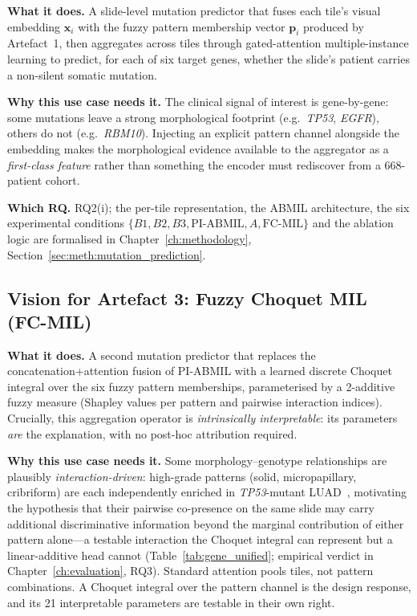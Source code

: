\textbf{What it does.}
A slide-level mutation predictor that fuses each tile's visual
embedding $\mathbf{x}_i$ with the fuzzy pattern membership vector
$\mathbf{p}_i$ produced by Artefact~1, then aggregates across tiles
through gated-attention multiple-instance learning to predict, for
each of six target genes, whether the slide's patient carries a
non-silent somatic mutation.

\textbf{Why this use case needs it.}
The clinical signal of interest is gene-by-gene: some mutations leave
a strong morphological footprint (e.g.~\textit{TP53}, \textit{EGFR}),
others do not (e.g.~\textit{RBM10}).
Injecting an explicit pattern channel alongside the embedding makes
the morphological evidence available to the aggregator as a
\emph{first-class feature} rather than something the encoder must
rediscover from a 668-patient cohort.

\textbf{Which RQ.}
RQ2(i); the per-tile representation, the ABMIL architecture, the
six experimental conditions $\{B1, B2, B3, \text{PI-ABMIL}, A,
\text{FC-MIL}\}$ and the ablation logic are formalised in
Chapter~\ref{ch:methodology},
Section~\ref{sec:meth:mutation_prediction}.


\subsection{Vision for Artefact 3: Fuzzy Choquet MIL (FC-MIL)}
\label{sec:uc:artifact3}

\textbf{What it does.}
A second mutation predictor that replaces the concatenation+attention
fusion of PI-ABMIL with a learned discrete Choquet integral over the
six fuzzy pattern memberships, parameterised by a 2-additive fuzzy
measure (Shapley values per pattern and pairwise interaction indices).
Crucially, this aggregation operator is \emph{intrinsically
interpretable}: its parameters \emph{are} the explanation, with no
post-hoc attribution required.

\textbf{Why this use case needs it.}
Some morphology--genotype relationships are plausibly
\emph{interaction-driven}: high-grade patterns
(solid, micropapillary, cribriform) are each independently enriched
in \textit{TP53}-mutant
LUAD~\cite{ahn2022tp53highgrade,zhang2022micropaptp53},
motivating the hypothesis that their pairwise co-presence on the
same slide may carry additional discriminative information beyond
the marginal contribution of either pattern alone---a testable
interaction the Choquet integral can represent but a linear-additive
head cannot (Table~\ref{tab:gene_unified}; empirical verdict in
Chapter~\ref{ch:evaluation}, RQ3).
Standard attention pools tiles, not pattern combinations.
A Choquet integral over the pattern channel is the design response,
and its 21 interpretable parameters are testable in their own right.

